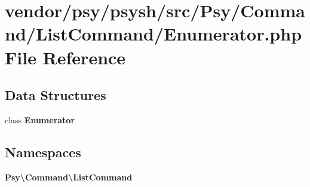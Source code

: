 \section{vendor/psy/psysh/src/\+Psy/\+Command/\+List\+Command/\+Enumerator.php File Reference}
\label{_enumerator_8php}
\subsection*{Data Structures}
\begin{DoxyCompactItemize}
\item 
class {\bf Enumerator}
\end{DoxyCompactItemize}
\subsection*{Namespaces}
\begin{DoxyCompactItemize}
\item 
 {\bf Psy\textbackslash{}\+Command\textbackslash{}\+List\+Command}
\end{DoxyCompactItemize}
